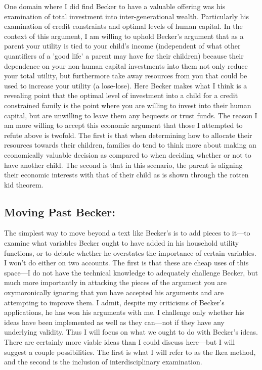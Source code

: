 \documentclass{article}
\begin{document}
One domain where I did find Becker to have a valuable offering was his examination of total investment into inter-generational wealth. Particularly his examination of credit constraints and optimal levels of human capital. In the context of this argument, I am willing to uphold Becker's argument that as a parent your utility is tied to your child's income (independent of what other quantifiers of a 'good life' a parent may have for their children) because their dependence on your non-human capital investments into them not only reduce your total utility, but furthermore take away resources from you that could be used to increase your utility (a lose-lose). Here Becker makes what I think is a revealing point that the optimal level of investment into a child for a credit constrained family is the point where you are willing to invest into their human capital, but are unwilling to leave them any bequests or trust funds. The reason I am more willing to accept this economic argument that those I attempted to refute above is twofold. The first is that when determining how to allocate their resources towards their children, families do tend to think more about making an economically valuable decision as compared to when deciding whether or not to have another child. The second is that in this scenario, the parent is aligning their economic interests with that of their child as is shown through the rotten kid theorem.

\subsection{Moving Past Becker:}

The simplest way to move beyond a text like Becker's is to add pieces to it—to examine what variables Becker ought to have added in his household utility functions, or to debate whether he overstates the importance of certain variables. I won't do either on two accounts. The first is that these are cheap uses of this space—I do not have the technical knowledge to adequately challenge Becker, but much more importantly in attacking the pieces of the argument you are oxymoronically ignoring that you have accepted his arguments and are attempting to improve them. I admit, despite my criticisms of Becker's applications, he has won his arguments with me. I challenge only whether his ideas have been implemented as well as they can—not if they have any underlying validity. Thus I will focus on what we ought to do with Becker's ideas. There are certainly more viable ideas than I could discuss here—but I will suggest a couple possibilities. The first is what I will refer to as the Ikea method, and the second is the inclusion of interdisciplinary examination. 
\end{document}
